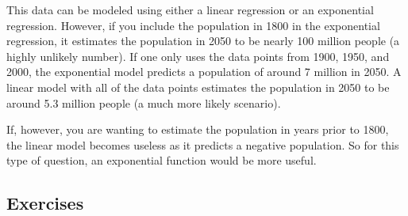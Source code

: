 \documentclass[
]{book}
\theoremstyle{definition}
\theoremstyle{definition}
\theoremstyle{definition}
\theoremstyle{definition}
\theoremstyle{remark}
\begin{document}
This data can be modeled using either a linear regression or an exponential regression. However, if you include the population in 1800 in the exponential regression, it estimates the population in 2050 to be nearly 100 million people (a highly unlikely number). If one only uses the data points from 1900, 1950, and 2000, the exponential model predicts a population of around 7 million in 2050. A linear model with all of the data points estimates the population in 2050 to be around 5.3 million people (a much more likely scenario).

If, however, you are wanting to estimate the population in years prior to 1800, the linear model becomes useless as it predicts a negative population. So for this type of question, an exponential function would be more useful.

\hypertarget{exercises-30}{%
\subsection{Exercises}\label{exercises-30}}
\end{document}
